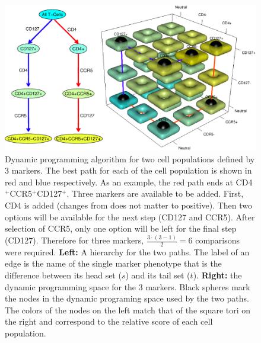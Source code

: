 \begin{figure}[ht]
  \begin{center}
    \includegraphics[width=\textwidth]{figs/rchy/2path}
  \end{center}
  \caption{Dynamic programming algorithm for two cell populations defined by $3$ markers.
    The best path for each of the cell population is shown in red and blue respectively.
    As an example, the red path ends at CD4$^+$CCR5$^+$CD127$^+$.
    Three markers are available to be added.
    First, CD4 is added (changes from does not matter to positive).
    Then two options will be available for the next step (CD127 and CCR5).
    After selection of CCR5, only one option will be left for the final step (CD127).
    Therefore for three markers, $\frac{3 \cdot (3-1)}{2}=6$ comparisons were required.
	\textbf{Left:} A hierarchy for the two paths. The label of an edge is the name of the single marker phenotype that
	is the difference between its head set ($s$) and its tail set ($t$).  \textbf{Right:} the dynamic programming space
	for the $3$ markers. Black spheres mark the nodes in the dynamic programing space used by the two paths. 
	The colors of the nodes on the left match that of the square tori on the right and  correspond to the relative score of each cell population. 
}
  \label{r1:3dDP}
\end{figure}


